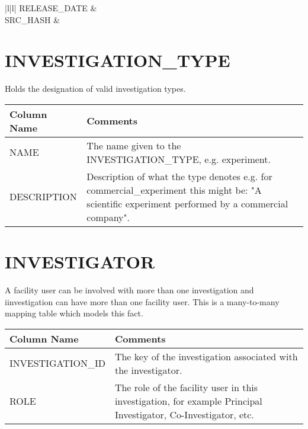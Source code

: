 \documentclass{report}
\begin{document}
\begin{supertabular}{|l|l|}
RELEASE\_DATE &  \\ \hline
SRC\_HASH &  \\ \hline
\end{supertabular}
\section{INVESTIGATION\_TYPE}

Holds the designation of valid investigation types.\\

\begin{tabular}{|l|l|}
\hline
Column Name & Comments \\ \hline
NAME & \multicolumn{1}{p{100mm}|}{
The name given to the INVESTIGATION\_TYPE, e.g. experiment.} \\ \hline
DESCRIPTION & \multicolumn{1}{p{100mm}|}{
Description of what the type denotes e.g. for commercial\_experiment this might be: "A scientific experiment performed by a commercial company".} \\ \hline
\end{tabular}
\section{INVESTIGATOR}

A facility user can be involved with more than one investigation and iinvestigation can have more than one facility user. This is a many-to-many mapping table which models this fact.\\

\begin{tabular}{|l|l|}
\hline
Column Name & Comments \\ \hline
INVESTIGATION\_ID & \multicolumn{1}{p{100mm}|}{
The key of the investigation associated with the investigator.} \\ \hline
ROLE & \multicolumn{1}{p{100mm}|}{
The role of the facility user in this investigation, for example Principal Investigator, Co-Investigator, etc.} \\ \hline
\end{tabular}
\end{document}
